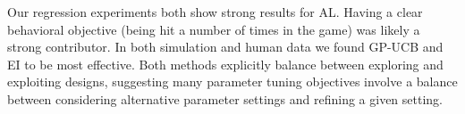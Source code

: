 \documentclass{sig-alternate}
\begin{document}
Our regression experiments both show strong results for AL.
Having a clear behavioral objective (being hit a number of times in the game) was likely a strong contributor.
In both simulation and human data we found GP-UCB and EI to be most effective.
Both methods explicitly balance between exploring and exploiting designs, suggesting many parameter tuning objectives involve a balance between considering alternative parameter settings and refining a given setting.


\end{document}
